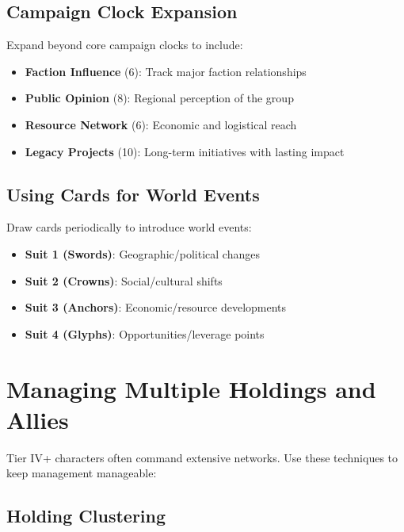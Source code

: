 \subsection*{Campaign Clock Expansion}

Expand beyond core campaign clocks to include:

\begin{itemize}
    \item \textbf{Faction Influence} (6): Track major faction relationships
    \item \textbf{Public Opinion} (8): Regional perception of the group
    \item \textbf{Resource Network} (6): Economic and logistical reach
    \item \textbf{Legacy Projects} (10): Long-term initiatives with lasting impact
\end{itemize}

\subsection*{Using Cards for World Events}

Draw cards periodically to introduce world events:

\begin{itemize}
    \item \textbf{Suit 1 (Swords)}: Geographic/political changes
    \item \textbf{Suit 2 (Crowns)}: Social/cultural shifts
    \item \textbf{Suit 3 (Anchors)}: Economic/resource developments
    \item \textbf{Suit 4 (Glyphs)}: Opportunities/leverage points
\end{itemize}

\section{Managing Multiple Holdings and Allies}

Tier IV+ characters often command extensive networks. Use these techniques to keep management manageable:

\subsection*{Holding Clustering}

